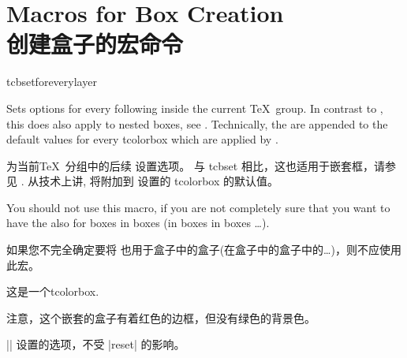 
\section{Macros for Box Creation\\创建盒子的宏命令}%
%

% 
% 











\begin{docCommand}{tcbsetforeverylayer}{}
\begin{stripedbox}
Sets options for every following  inside the current \TeX\ group.
In contrast to , this does also
apply to nested boxes, see .
Technically, the  are appended to the default values for every
tcolorbox which are applied by .\par
\tcblower
为当前\TeX\ 分组中的后续  设置选项。
与 tcbset 相比，这也适用于嵌套框，请参见 .
从技术上讲,   将附加到  设置的 tcolorbox 的默认值。\par
\end{stripedbox}



  
You should not use this macro, if you are not completely sure that you
want to have the  also for boxes in boxes (in boxes in boxes \ldots).

如果您不完全确定要将  也用于盒子中的盒子(在盒子中的盒子中的\ldots)，则不应使用此宏。
\begin{dispExample}

\begin{tcolorbox}[title=All options for this box]
这是一个tcolorbox.\par\medskip
  \begin{tcolorbox}[title=嵌套的盒子]
    注意，这个嵌套的盒子有着红色的边框，但没有绿色的背景色。
  \end{tcolorbox}
\end{tcolorbox}
\bigskip

\begin{tcolorbox}[reset]
|\tcbsetforeverylayer| 设置的选项，不受 |reset| 的影响。
\end{tcolorbox}
\end{dispExample}
\end{docCommand}


